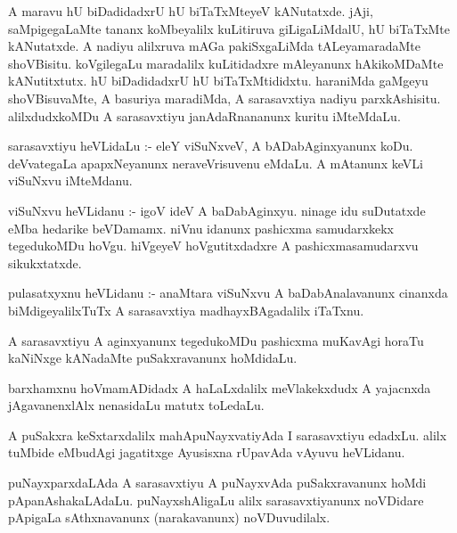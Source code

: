 \documentclass{article}
\begin{document}
\begin{mn}
A  maravu  hU  biDadidadxrU  hU  biTaTxMteyeV  kANutatxde. jAji,  saMpigegaLaMte  tananx  
koMbeyalilx  kuLitiruva  giLigaLiMdalU,  hU biTaTxMte  kANutatxde.   A nadiyu  alilxruva  
mAGa  pakiSxgaLiMda  tALeyamaradaMte  shoVBisitu.  koVgilegaLu  maradalilx  kuLitidadxre  
mAleyanunx  hAkikoMDaMte  kANutitxtutx.  hU  biDadidadxrU  hU  biTaTxMtididxtu.  haraniMda  
gaMgeyu  shoVBisuvaMte,  A  basuriya  maradiMda,  A sarasavxtiya  nadiyu  parxkAshisitu.  
alilxdudxkoMDu  A  sarasavxtiyu  janAdaRnananunx  kuritu  iMteMdaLu.
\end{mn}

\begin{mn}
sarasavxtiyu  heVLidaLu :- eleY  viSuNxveV,  A  bADabAginxyanunx  koDu.  deVvategaLa  
apapxNeyanunx  neraveVrisuvenu  eMdaLu.  A  mAtanunx  keVLi  viSuNxvu  iMteMdanu.
\end{mn}

\begin{mn}
viSuNxvu  heVLidanu :- igoV  ideV  A  baDabAginxyu.  ninage  idu  suDutatxde  
eMba  hedarike  beVDamamx.  niVnu  idanunx  pashicxma samudarxkekx  tegedukoMDu  
hoVgu.  hiVgeyeV  hoVgutitxdadxre  A  pashicxmasamudarxvu  sikukxtatxde.
\end{mn}

\begin{mn}
pulasatxyxnu  heVLidanu :- anaMtara  viSuNxvu  A  baDabAnalavanunx  cinanxda  
biMdigeyalilxTuTx A  sarasavxtiya  madhayxBAgadalilx  iTaTxnu.
\end{mn}

\begin{mn}
A  sarasavxtiyu  A  aginxyanunx  tegedukoMDu  pashicxma  muKavAgi  horaTu  
kaNiNxge  kANadaMte  puSakxravanunx  hoMdidaLu.
\end{mn}

\begin{mn}
barxhamxnu  hoVmamADidadx  A  haLaLxdalilx  meVlakekxdudx  A  yajacnxda  
jAgavanenxlAlx  nenasidaLu  matutx  toLedaLu.
\end{mn}

\begin{mn}
A  puSakxra keSxtarxdalilx  mahApuNayxvatiyAda  I  sarasavxtiyu  edadxLu.  alilx  
tuMbide  eMbudAgi  jagatitxge  Ayusisxna  rUpavAda  vAyuvu  heVLidanu.
\end{mn}

\begin{mn}
puNayxparxdaLAda A  sarasavxtiyu  A  puNayxvAda  puSakxravanunx  hoMdi  
pApanAshakaLAdaLu.   puNayxshAligaLu  alilx  sarasavxtiyanunx  noVDidare  
pApigaLa  sAthxnavanunx (narakavanunx) noVDuvudilalx.
\end{mn}
\end{document}
